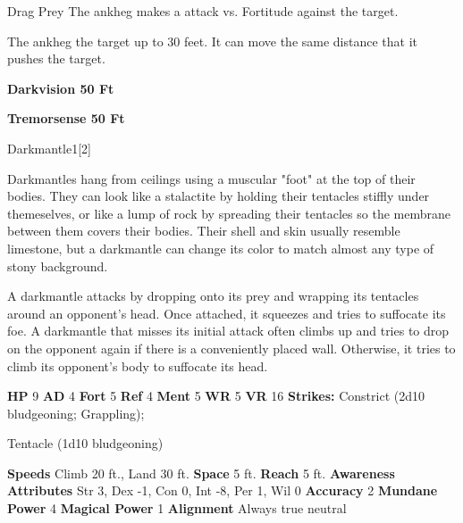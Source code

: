     \begin{freeability}{Drag Prey}
       The ankheg makes a  attack
        vs. Fortitude against the target.
    
    \hit The ankheg  the target up to 30 feet.
          It can move the same distance that it pushes the target.
    \end{freeability}
  
      
      \par \textbf{Darkvision 50 Ft}
    \par \textbf{Tremorsense 50 Ft}
  
  \begin{monsection}{Darkmantle}{1}[2]
    \vspace{-1em}\vspace{-1em}
    \vspace{0em}

    
      Darkmantles hang from ceilings using a muscular "foot" at the top of their bodies.
      They can look like a stalactite by holding their tentacles stiffly under themeselves, or like a lump of rock by spreading their tentacles so the membrane between them covers their bodies.
      Their shell and skin usually resemble limestone, but a darkmantle can change its color to match almost any type of stony background.

      A darkmantle attacks by dropping onto its prey and wrapping its tentacles around an opponent's head.
      Once attached, it squeezes and tries to suffocate its foe.
      A darkmantle that misses its initial attack often climbs up and tries to drop on the opponent again if there is a conveniently placed wall.
      Otherwise, it tries to climb its opponent's body to suffocate its head.
    
    

    \begin{spellcontent}
      \begin{spelltargetinginfo}
        \pari \textbf{HP} 9 \monsep
          \textbf{AD} 4 \monsep
          \textbf{Fort} 5 \monsep
          \textbf{Ref} 4 \monsep
          \textbf{Ment} 5
        \pari \textbf{WR} 5 \monsep
        \textbf{VR} 16
        \pari \textbf{Strikes:}
            Constrict  (2d10 bludgeoning; Grappling);
\par Tentacle  (1d10 bludgeoning)
      \end{spelltargetinginfo}
    \end{spellcontent}
    \begin{monsterfooter}
      \pari \textbf{Speeds} Climb 20 ft., Land 30 ft. \monsep
        \textbf{Space} 5 ft. \monsep
        \textbf{Reach} 5 ft.
      \pari \textbf{Awareness} 
      \pari \textbf{Attributes}
        Str 3, Dex -1,
        Con 0, Int -8,
        Per 1, Wil 0
      \pari \textbf{Accuracy} 2 \monsep
        \textbf{Mundane Power} 4 \monsep
      \textbf{Magical Power} 1
      \pari \textbf{Alignment} Always true neutral
    \end{monsterfooter}
  \end{monsection}
